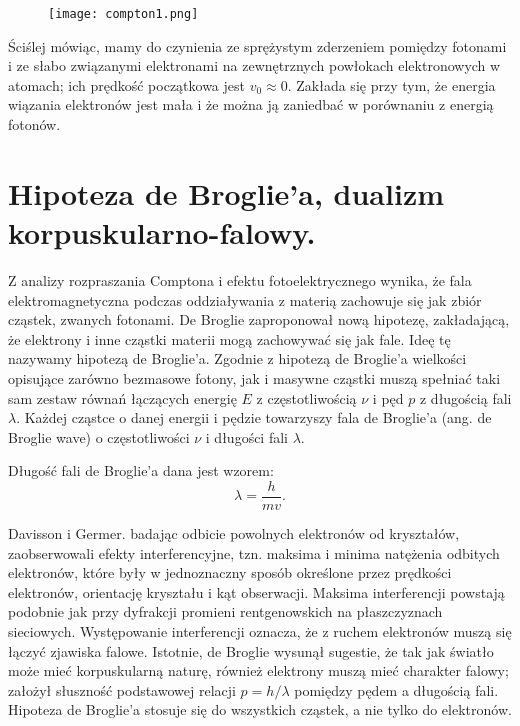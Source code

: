 \documentclass{article}
\begin{document}
\begin{figure}[H]
    \centering
    \texttt{[image: compton1.png]}
    \label{fig:compton1}
\end{figure}
Ściślej mówiąc, mamy do czynienia ze sprężystym zderzeniem pomiędzy fotonami i ze słabo związanymi elektronami na zewnętrznych powłokach elektronowych w atomach; ich prędkość początkowa jest $v_0 \approx 0$. Zakłada się przy tym, że energia wiązania elektronów jest mała i że można ją zaniedbać w porównaniu z energią fotonów.


\section{Hipoteza de Broglie’a, dualizm korpuskularno-falowy.}
Z analizy rozpraszania Comptona i efektu fotoelektrycznego wynika, że fala elektromagnetyczna podczas oddziaływania z materią zachowuje się jak zbiór cząstek, zwanych fotonami. De Broglie zaproponował nową hipotezę, zakładającą, że elektrony i inne cząstki materii mogą zachowywać się jak fale. Ideę tę nazywamy hipotezą de Broglie’a. Zgodnie z hipotezą de Broglie’a wielkości opisujące zarówno bezmasowe fotony, jak i masywne cząstki muszą spełniać taki sam zestaw równań łączących energię $E$ z częstotliwością $\nu$ i pęd $p$ z długością fali $\lambda$. Każdej cząstce o danej energii i pędzie towarzyszy fala de Broglie’a (ang. de Broglie wave) o częstotliwości $\nu$ i długości fali $\lambda$. 

Długość fali de Broglie'a dana jest wzorem:
\begin{equation*}
    \lambda=\frac{h}{mv}.
\end{equation*}

Davisson i Germer. badając odbicie powolnych elektronów od kryształów, zaobserwowali efekty interferencyjne, tzn. maksima i minima natężenia odbitych elektronów, które były w jednoznaczny sposób określone przez prędkości elektronów, orientację kryształu i kąt obserwacji. Maksima interferencji powstają podobnie jak przy dyfrakcji promieni rentgenowskich na płaszczyznach sieciowych. Występowanie interferencji oznacza, że z ruchem elektronów muszą się łączyć zjawiska falowe. Istotnie, de Broglie wysunął sugestie, że tak jak światło może mieć korpuskularną naturę, również elektrony muszą mieć charakter falowy; założył słuszność podstawowej relacji $p=h/\lambda$ pomiędzy pędem a długością fali. \\
Hipoteza de Broglie'a stosuje się do wszystkich cząstek, a nie tylko do elektronów. 
\end{document}
